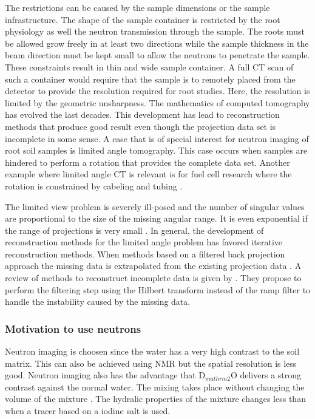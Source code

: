 \documentclass[a4paper,11pt]{scrreprt}
\begin{document}
The restrictions can be caused by the sample dimensions or
the sample infrastructure. The shape of the sample container is restricted by the root 
physiology as well the neutron transmission through the sample. The roots must be allowed 
grow freely in at least two directions while the sample thickness in the beam direction 
must be kept small to allow the neutrons to penetrate the sample. These constraints result in 
thin and wide sample container. A full CT scan of such a container would require that the sample
is to remotely placed from the detector to provide the resolution required for root studies. Here, 
the resolution is limited by the geometric unsharpness. The mathematics of computed 
tomography has evolved the last decades. This development has lead to reconstruction 
methods that produce good result even though the projection data set is incomplete in some sense. A case that is
of special interest for neutron imaging of root soil samples is limited angle tomography. 
This case occurs when samples are hindered to perform a rotation that provides the
complete data set. Another example where limited angle CT is relevant is for fuel cell research where 
the rotation is constrained by cabeling and tubing \cite{lange2011_directt_fuelcell}. 

The limited view problem is severely ill-posed and the number of singular values are proportional
to the size of the missing angular range. It is even exponential if the range of projections is 
very small \cite{natterer2001}. In general, the development of reconstruction methods for 
the limited angle problem has favored iterative reconstruction methods. When methods based on a 
filtered back projection approach the missing data is extrapolated from the existing projection 
data \cite{Ramm1991_limitedangle,ramm1992d}. A review of methods to reconstruct incomplete data is 
given by \cite{clackdoyle2010_incompletedatact}. They propose to perform the filtering step using the
Hilbert transform instead of the ramp filter to handle the instability caused by the missing data.

\subsubsection{Motivation to use neutrons}
Neutron imaging is choosen since the water has a very high contrast to the soil matrix. This can 
also be achieved using NMR but the spatial resolution is less good. Neutron imaging also has the 
advantage that D$_{mathrm{2}}$O delivers a strong contrast against the normal water. The mixing 
takes place without changing the volume of the mixture \cite{longsworth1937_h2o_d2o}. The hydralic properties of the mixture
changes less than when a tracer based on a iodine salt is used. 
\end{document}
